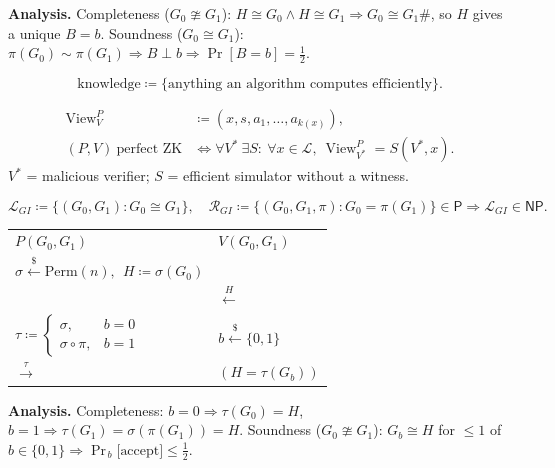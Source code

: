 \documentclass[11pt,a4paper]{article}
\newcommand{\bits}{\{0,1\}}
\newcommand{\lang}{\mathcal{L}}
\newcommand{\rel}{\mathcal{R}}
\newcommand{\Perm}{\mathrm{Perm}}
\newcommand{\samp}{\overset{\$}{\leftarrow}}
\newcommand{\iso}{\cong}
\newcommand{\niso}{\ncong}
\DeclareMathOperator{\View}{View}
\begin{document}
\noindent\textbf{Analysis.}\quad
Completeness ($G_0\niso G_1$): $H\iso G_0 \wedge H\iso G_1 \Rightarrow G_0\iso G_1$\#, so $H$ gives a unique $B=b$. \quad
Soundness ($G_0\iso G_1$): $\pi(G_0)\sim\pi(G_1) \Rightarrow B\perp b \Rightarrow \Pr[B=b]=\tfrac12$.

\begin{definition}
\[
  \mathrm{knowledge} \coloneqq \{\text{anything an algorithm computes efficiently}\}.
\]
\end{definition}

\begin{definition}
\begin{align*}
  \View_V^P &\coloneqq (x,s,a_1,\dots,a_{k(x)}),\\
  (P,V)\ \text{perfect ZK} &\iff \forall V^*\ \exists S:\ \forall x\in\lang,\ \View_{V^*}^P = S(V^*,x).
\end{align*}
$V^*$ = malicious verifier; $S$ = efficient simulator without a witness.
\end{definition}

\begin{definition}
\[
  \lang_{GI} \coloneqq \{(G_0,G_1): G_0\iso G_1\},
  \quad
  \rel_{GI} \coloneqq \{(G_0,G_1,\pi): G_0=\pi(G_1)\} \in\mathsf{P}
  \Rightarrow \lang_{GI}\in\mathsf{NP}.
\]
\end{definition}

\begin{protocol}[$\lang_{GI}$, perfect ZK]
\begin{tabular}{@{}p{}p{}@{}}
$P(G_0,G_1)$ & $V(G_0,G_1)$\\[2pt]
$\sigma\samp\Perm(n),\ \ H\coloneqq\sigma(G_0)$ & \\
 & \hfill$\xleftarrow{\;H\;}$\\[2pt]
$\tau\coloneqq\begin{cases}\sigma, & b=0\\ \sigma\circ\pi, & b=1\end{cases}$
  & $b\samp\bits$\\
\hfill$\xrightarrow{\;\tau\;}$ & $(H=\tau(G_b))$\\
\end{tabular}
\end{protocol}

\noindent\textbf{Analysis.}\quad
Completeness: $b=0\Rightarrow\tau(G_0)=H$, \ $b=1\Rightarrow\tau(G_1)=\sigma(\pi(G_1))=H$. \quad
Soundness ($G_0\niso G_1$): $G_b\iso H$ for $\le 1$ of $b\in\bits \Rightarrow \Pr_{\,b}\!\bigl[\text{accept}\bigr]\le\tfrac12$.
\end{document}
